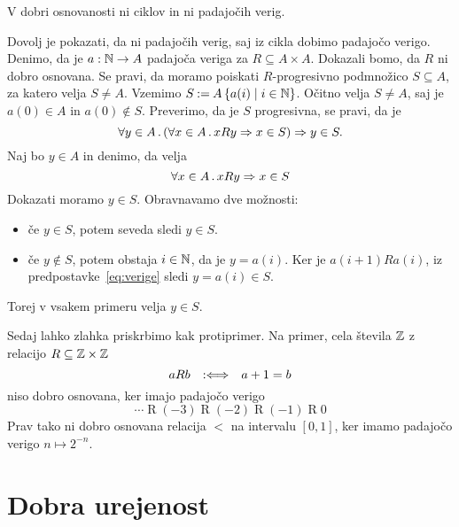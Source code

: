 \begin{lema}
  V dobri osnovanosti ni ciklov in ni padajočih verig.
\end{lema}

\begin{dokaz}
  Dovolj je pokazati, da ni padajočih verig, saj iz cikla dobimo padajočo verigo.
  Denimo, da je $a : \mathbb{N} \to A$ padajoča veriga za $R \subseteq A \times A$. Dokazali bomo, da $R$ ni dobro
  osnovana. Se pravi, da moramo poiskati $R$-progresivno podmnožico $S \subseteq A$, za katero velja
  $S \neq A$. Vzemimo $S \mathbin{{:}{=}} A \left\{ a(i) \mid i \in \mathbb{N}\right\}$. Očitno velja $S \neq A$, saj je $a(0) \in A$ in
  $a(0) \not\in S$. Preverimo, da je $S$ progresivna, se pravi, da je
  \begin{equation*}
    \forall y \in A \,.\, (\forall x \in A \,.\, x R y \Rightarrow x \in S) \Rightarrow y \in S.
  \end{equation*}
  Naj bo $y \in A$ in denimo, da velja
  \begin{equation}
    \label{eq:verige}
    \forall x \in A \,.\, x R y \Rightarrow x \in S
  \end{equation}
  Dokazati moramo $y \in S$. Obravnavamo dve možnosti:
  \begin{itemize}
  \item če $y \in S$, potem seveda sledi $y \in S$.
  \item če $y \not\in S$, potem obstaja $i \in \mathbb{N}$, da je $y = a(i)$. Ker je $a(i+1) R a(i)$, iz
    predpostavke~\eqref{eq:verige} sledi $y = a(i) \in S$.
  \end{itemize}
  Torej v vsakem primeru velja $y \in S$.
\end{dokaz}

\begin{primer}
  Sedaj lahko zlahka priskrbimo kak protiprimer. Na primer, cela števila $\mathbb{Z}$ z relacijo $R \subseteq \mathbb{Z} \times \mathbb{Z}$
  \begin{equation*}
    a R b \quad {{:}{\Longleftrightarrow}}\quad a + 1 = b
  \end{equation*}
  niso dobro osnovana, ker imajo padajočo verigo
  \begin{equation*}
    \cdots \mathrel{R} (-3) \mathrel{R} (-2) \mathrel{R} (-1) \mathrel{R} 0
  \end{equation*}
  Prav tako ni dobro osnovana relacija $<$ na intervalu $[0,1]$, ker imamo padajočo verigo
  $n \mapsto 2^{-n}$.
\end{primer}

\section{Dobra urejenost}

